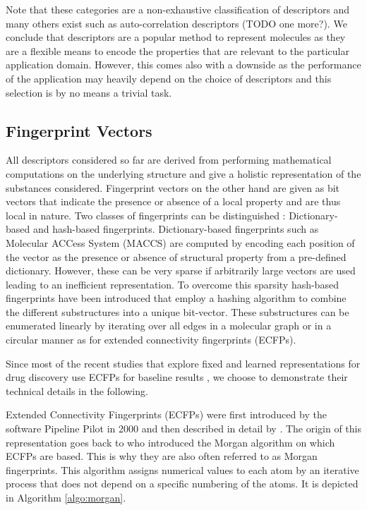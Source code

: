 Note that these categories are a non-exhaustive classification of descriptors and many others exist such as auto-correlation descriptors \citep{broto1984molecular} (TODO one more?). We conclude that descriptors are a popular method to represent molecules as they are a flexible means to encode the properties that are relevant to the particular application domain. However, this comes also with a downside as the performance of the application may heavily depend on the choice of descriptors and this selection is by no means a trivial task.

\subsection{Fingerprint Vectors}

All descriptors considered so far are derived from performing mathematical computations on the underlying structure and give a holistic representation of the substances considered. Fingerprint vectors on the other hand are given as bit vectors that indicate the presence or absence of a local property and are thus local in nature. Two classes of fingerprints can be distinguished \citep{SHEN201929}: Dictionary-based and hash-based fingerprints. Dictionary-based fingerprints such as Molecular ACCess System (MACCS) are computed by encoding each position of the vector as the presence or absence of structural property from a pre-defined dictionary. However, these can be very sparse if arbitrarily large vectors are used leading to an inefficient representation. To overcome this sparsity hash-based fingerprints have been introduced that employ a hashing algorithm to combine the different substructures into a unique bit-vector. These substructures can be enumerated linearly by iterating over all edges in a molecular graph \citep{daylight} or in a circular manner as for extended connectivity fingerprints (ECFPs). 

Since most of the recent studies that explore fixed and learned representations for drug discovery use ECFPs for baseline results \citep{li2017learning, STOKES2020688,wu2018moleculenet}, we choose to demonstrate their technical details in the following.

Extended Connectivity Fingerprints (ECFPs) were first introduced by the software Pipeline Pilot in 2000 and then described in detail by \cite{ECFP}. The origin of this representation goes back to \cite{morgan} who introduced the Morgan algorithm on which ECFPs are based. This is why they are also often referred to as Morgan fingerprints. This algorithm assigns numerical values to each atom by an iterative process that does not depend on a specific numbering of the atoms. It is depicted in Algorithm \ref{algo:morgan}.

